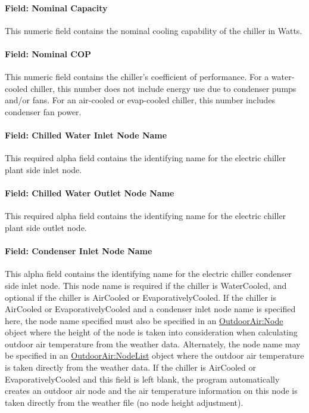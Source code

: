 \paragraph{Field: Nominal Capacity}\label{field-nominal-capacity-3}

This numeric field contains the nominal cooling capability of the chiller in Watts.

\paragraph{Field: Nominal COP}\label{field-nominal-cop-1}

This numeric field contains the chiller's coefficient of performance. For a water-cooled chiller, this number does not include energy use due to condenser pumps and/or fans. For an air-cooled or evap-cooled chiller, this number includes condenser fan power.

\paragraph{Field: Chilled Water Inlet Node Name}\label{field-chilled-water-inlet-node-name-3}

This required alpha field contains the identifying name for the electric chiller plant side inlet node.

\paragraph{Field: Chilled Water Outlet Node Name}\label{field-chilled-water-outlet-node-name-3}

This required alpha field contains the identifying name for the electric chiller plant side outlet node.

\paragraph{Field: Condenser Inlet Node Name}\label{field-condenser-inlet-node-name-3}

This alpha field contains the identifying name for the electric chiller condenser side inlet node. This node name is required if the chiller is WaterCooled, and optional if the chiller is AirCooled or EvaporativelyCooled. If the chiller is AirCooled or EvaporativelyCooled and a condenser inlet node name is specified here, the node name specified must also be specified in an \hyperref[outdoorairnode]{OutdoorAir:Node} object where the height of the node is taken into consideration when calculating outdoor air temperature from the weather data. Alternately, the node name may be specified in an \hyperref[outdoorairnodelist]{OutdoorAir:NodeList} object where the outdoor air temperature is taken directly from the weather data. If the chiller is AirCooled or EvaporativelyCooled and this field is left blank, the program automatically creates an outdoor air node and the air temperature information on this node is taken directly from the weather file (no node height adjustment).

